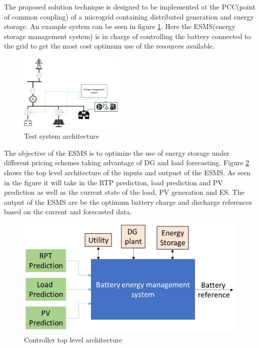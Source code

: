 The proposed solution technique is designed to be implemented at the PCC(point of common coupling) of a microgrid containing distributed generation and energy storage. An example system can be seen in figure \ref{fig:system_arch}. Here the 
ESMS(energy storage management system) is in charge of controlling the battery connected to the grid to get the most cost optimum use of the resources available.
\begin{figure}[!htbp]
\centering
\includegraphics[width=0.45\textwidth]{figs/System_architecture.png}
\caption{Test system architecture}
\label{fig:system_arch}
\vspace{-3mm}
\end{figure}

The objective of the ESMS is to optimize the use of energy storage under different pricing schemes taking advantage of DG and load forecasting. Figure \ref{fig:F1_CA} shows the top level architecture of the inputs and outpust of the ESMS. As seen in the figure it will take in the RTP prediction, load prediction and PV prediction as well as the current state of the load, PV generation and ES. The output of the ESMS are be the optimum battery charge and discharge references based on the current and forecasted data.

\begin{figure}[!ht]
    \centering
    \includegraphics[width = \linewidth]{figs/EMS_FIG.png}
    \caption{Controller top level architecture}
    \label{fig:F1_CA}
\end{figure}


